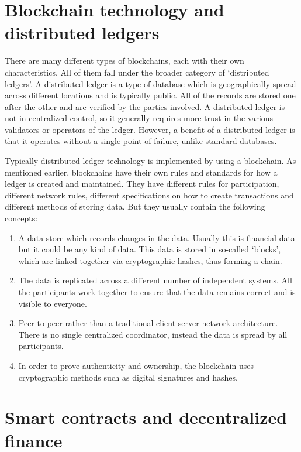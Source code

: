 \section{Blockchain technology and distributed ledgers }

There are many different types of blockchains, each with their own characteristics. All of them  fall under the broader category of ‘distributed ledgers’. A distributed ledger is a type of database which is geographically spread across different locations and is typically public. All of the records are stored one after the other and are verified by the parties involved. A distributed ledger is not in centralized control, so it generally requires more trust in the various validators or operators of the ledger. However, a benefit of a distributed ledger is that it operates without a single point-of-failure, unlike standard databases.~\autocite{Hancock2016} \bigbreak 

Typically distributed ledger technology is implemented by using a blockchain. As mentioned earlier, blockchains have their own rules and standards for how a ledger is created and maintained. They have different rules for participation, different network rules, different specifications on how to create transactions and different methods of storing data. But they usually contain the following concepts: 
\begin{enumerate}
\item	A data store which records changes in the data. Usually this is financial data but it could  be any kind of data. This data is stored in so-called ‘blocks’, which are linked together via cryptographic hashes, thus forming a chain.
\item	The data is replicated across a different number of independent systems. All the participants work together to ensure that the data remains correct and is visible to everyone.
\item	Peer-to-peer rather than a traditional client-server network architecture. There is no single centralized coordinator, instead the data is spread by all participants.
\item	In order to prove authenticity and ownership, the blockchain uses cryptographic methods such as digital signatures and hashes. ~\autocite{Lewis2018}
\end{enumerate} \bigbreak

\section{Smart contracts and decentralized finance}\bigbreak

